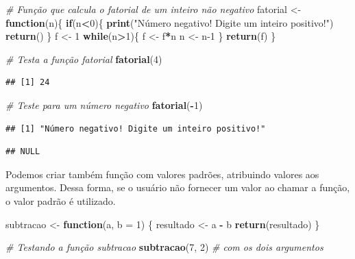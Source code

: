 \documentclass[
]{book}
\newenvironment{Shaded}{\begin{snugshade}}{\end{snugshade}}
\newcommand{\AttributeTok}[1]{\textcolor[rgb]{0.13,0.29,0.53}{#1}}
\newcommand{\CommentTok}[1]{\textcolor[rgb]{0.56,0.35,0.01}{\textit{#1}}}
\newcommand{\ControlFlowTok}[1]{\textcolor[rgb]{0.13,0.29,0.53}{\textbf{#1}}}
\newcommand{\DecValTok}[1]{\textcolor[rgb]{0.00,0.00,0.81}{#1}}
\newcommand{\FunctionTok}[1]{\textcolor[rgb]{0.13,0.29,0.53}{\textbf{#1}}}
\newcommand{\NormalTok}[1]{#1}
\newcommand{\OtherTok}[1]{\textcolor[rgb]{0.56,0.35,0.01}{#1}}
\newcommand{\SpecialCharTok}[1]{\textcolor[rgb]{0.81,0.36,0.00}{\textbf{#1}}}
\newcommand{\StringTok}[1]{\textcolor[rgb]{0.31,0.60,0.02}{#1}}
\begin{document}
\begin{Shaded}
\begin{Highlighting}[]
\CommentTok{\# Função que calcula o fatorial de um inteiro não negativo}
\NormalTok{fatorial }\OtherTok{\textless{}{-}} \ControlFlowTok{function}\NormalTok{(n)\{}
  \ControlFlowTok{if}\NormalTok{(n}\SpecialCharTok{\textless{}}\DecValTok{0}\NormalTok{)\{}
    \FunctionTok{print}\NormalTok{(}\StringTok{"Número negativo! Digite um inteiro positivo!"}\NormalTok{)}
    \FunctionTok{return}\NormalTok{()}
\NormalTok{  \}}
\NormalTok{  f }\OtherTok{\textless{}{-}} \DecValTok{1}
  \ControlFlowTok{while}\NormalTok{(n}\SpecialCharTok{\textgreater{}}\DecValTok{1}\NormalTok{)\{}
\NormalTok{    f }\OtherTok{\textless{}{-}}\NormalTok{ f}\SpecialCharTok{*}\NormalTok{n}
\NormalTok{    n }\OtherTok{\textless{}{-}}\NormalTok{ n}\DecValTok{{-}1}
\NormalTok{  \}}
  \FunctionTok{return}\NormalTok{(f)}
\NormalTok{\}}

\CommentTok{\# Testa a função \textquotesingle{}fatorial\textquotesingle{}}
\FunctionTok{fatorial}\NormalTok{(}\DecValTok{4}\NormalTok{)}
\end{Highlighting}
\end{Shaded}

\begin{verbatim}
## [1] 24
\end{verbatim}

\begin{Shaded}
\begin{Highlighting}[]
\CommentTok{\# Teste para um número negativo}
\FunctionTok{fatorial}\NormalTok{(}\SpecialCharTok{{-}}\DecValTok{1}\NormalTok{)}
\end{Highlighting}
\end{Shaded}

\begin{verbatim}
## [1] "Número negativo! Digite um inteiro positivo!"
\end{verbatim}

\begin{verbatim}
## NULL
\end{verbatim}

Podemos criar também função com valores padrões, atribuindo valores aos argumentos. Dessa forma, se o usuário não fornecer um valor ao chamar a função, o valor padrão é utilizado.

\begin{Shaded}
\begin{Highlighting}[]
\NormalTok{subtracao }\OtherTok{\textless{}{-}} \ControlFlowTok{function}\NormalTok{(a, }\AttributeTok{b =} \DecValTok{1}\NormalTok{) \{}
\NormalTok{  resultado }\OtherTok{\textless{}{-}}\NormalTok{ a }\SpecialCharTok{{-}}\NormalTok{ b}
  \FunctionTok{return}\NormalTok{(resultado)}
\NormalTok{\}}

\CommentTok{\# Testando a função \textquotesingle{}subtracao\textquotesingle{}}
\FunctionTok{subtracao}\NormalTok{(}\DecValTok{7}\NormalTok{, }\DecValTok{2}\NormalTok{) }\CommentTok{\# com os dois argumentos}
\end{Highlighting}
\end{Shaded}
\end{document}
